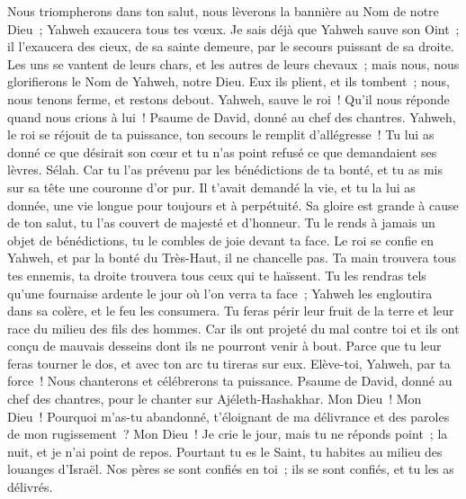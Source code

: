 \begin{multicols}{2}
Nous triompherons dans ton salut, nous lèverons la bannière au Nom de notre Dieu~; Yahweh exaucera tous tes vœux.
Je sais déjà que Yahweh sauve son Oint~; il l'exaucera des cieux, de sa sainte demeure, par le secours puissant de sa droite.
Les uns se vantent de leurs chars, et les autres de leurs chevaux~; mais nous, nous glorifierons le Nom de Yahweh, notre Dieu.
Eux ils plient, et ils tombent~; nous, nous tenons ferme, et restons debout.
Yahweh, sauve le roi~! Qu'il nous réponde quand nous crions à lui~!
\VerseOne{}Psaume de David, donné au chef des chantres.
Yahweh, le roi se réjouit de ta puissance, ton secours le remplit d'allégresse~!
Tu lui as donné ce que désirait son cœur et tu n'as point refusé ce que demandaient ses lèvres. Sélah.
Car tu l'as prévenu par les bénédictions de ta bonté, et tu as mis sur sa tête une couronne d'or pur.
Il t'avait demandé la vie, et tu la lui as donnée, une vie longue pour toujours et à perpétuité.
Sa gloire est grande à cause de ton salut, tu l'as couvert de majesté et d'honneur.
Tu le rends à jamais un objet de bénédictions, tu le combles de joie devant ta face.
Le roi se confie en Yahweh, et par la bonté du Très-Haut, il ne chancelle pas.
Ta main trouvera tous tes ennemis, ta droite trouvera tous ceux qui te haïssent.
Tu les rendras tels qu'une fournaise ardente le jour où l'on verra ta face~; Yahweh les engloutira dans sa colère, et le feu les consumera.
Tu feras périr leur fruit de la terre et leur race du milieu des fils des hommes.
Car ils ont projeté du mal contre toi et ils ont conçu de mauvais desseins dont ils ne pourront venir à bout.
Parce que tu leur feras tourner le dos, et avec ton arc tu tireras sur eux.
Elève-toi, Yahweh, par ta force~! Nous chanterons et célébrerons ta puissance.
\VerseOne{}Psaume de David, donné au chef des chantres, pour le chanter sur Ajéleth-Hashakhar.
Mon Dieu~! Mon Dieu~! Pourquoi m'as-tu abandonné, t'éloignant de ma délivrance et des paroles de mon rugissement~?
Mon Dieu~! Je crie le jour, mais tu ne réponds point~; la nuit, et je n'ai point de repos.
Pourtant tu es le Saint, tu habites au milieu des louanges d'Israël.
Nos pères se sont confiés en toi~; ils se sont confiés, et tu les as délivrés.

\end{multicols}
